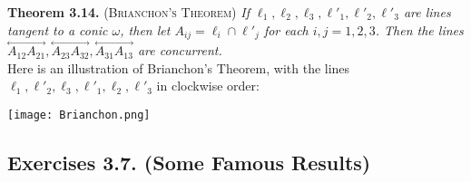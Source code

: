 \documentclass[leqno]{book}
\begin{document}
\noindent\textbf{Theorem 3.14.} \textsc{(Brianchon's Theorem)} \emph{If $\ell_1,\ell_2,\ell_3,\ell'_1,\ell'_2,\ell'_3$ are lines tangent to a conic $\omega$, then let $A_{ij}=\ell_i\cap\ell'_j$ for each $i,j=1,2,3$.  Then the lines $\overset{\longleftrightarrow}{A_{12}A_{21}},\overset{\longleftrightarrow}{A_{23}A_{32}},\overset{\longleftrightarrow}{A_{31}A_{13}}$ are concurrent.}\\

\noindent Here is an illustration of Brianchon's Theorem, with the lines $\ell_1,\ell'_2,\ell_3,\ell'_1,\ell_2,\ell'_3$ in clockwise order:
\begin{center}
\texttt{[image: Brianchon.png]}
\end{center}

\subsection*{Exercises 3.7. (Some Famous Results)} %
\end{document}
